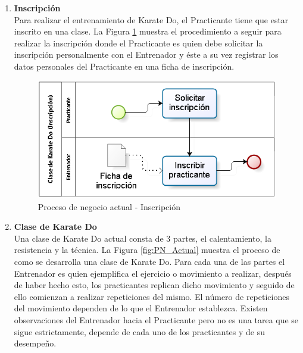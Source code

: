 \begin{enumerate}
	\item \textbf{Inscripción}\\
	Para realizar el entrenamiento de Karate Do, el Practicante tiene que estar inscrito en una clase. La Figura \ref{fig:PN_Actual_Inscripcion}  muestra el procedimiento a seguir para realizar la inscripción donde el Practicante es quien debe solicitar la inscripción personalmente con el Entrenador y éste a su vez registrar los datos personales del Practicante en una ficha de inscripción.\\
	
	\begin{figure}[H]
		\begin{center}
			\includegraphics[scale=0.7]{./Figuras/Negocio/Proceso_de_Negocio_actual_inscripcion}
		\end{center}
		\caption{Proceso de negocio actual - Inscripción}
		\label{fig:PN_Actual_Inscripcion}
	\end{figure}

	\item \textbf{Clase de Karate Do}\\
	Una clase de Karate Do actual consta de 3 partes, el calentamiento, la resistencia y la técnica. La Figura \ref{fig:PN_Actual}  muestra el proceso de como se desarrolla una clase de Karate Do.  Para cada una de las partes el Entrenador es quien ejemplifica el ejercicio o movimiento a realizar, después de haber hecho esto, los practicantes replican dicho movimiento y seguido de ello comienzan a realizar repeticiones del mismo. El número de repeticiones del movimiento dependen de lo que el Entrenador establezca. Existen observaciones del Entrenador hacia el Practicante pero no es una tarea que se sigue estrictamente, depende de cada uno de los practicantes y de su desempeño.
	

\end{enumerate}
